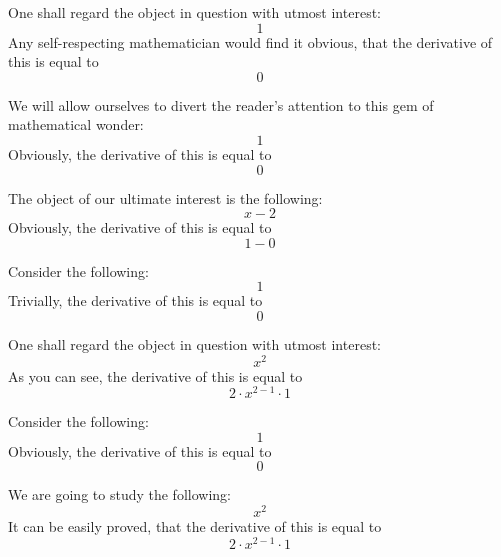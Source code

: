 \documentclass{article}
\begin{document}
One shall regard the object in question with utmost interest:
\begin{equation}
1 
\end{equation}
Any self-respecting mathematician would find it obvious, that the derivative of this is equal to
\begin{equation}
0 
\end{equation}

We will allow ourselves to divert the reader's attention to this gem of mathematical wonder:
\begin{equation}
1 
\end{equation}
Obviously, the derivative of this is equal to
\begin{equation}
0 
\end{equation}

The object of our ultimate interest is the following:
\begin{equation}
x - 2 
\end{equation}
Obviously, the derivative of this is equal to
\begin{equation}
1 - 0 
\end{equation}

Consider the following:
\begin{equation}
1 
\end{equation}
Trivially, the derivative of this is equal to
\begin{equation}
0 
\end{equation}

One shall regard the object in question with utmost interest:
\begin{equation}
x ^{2 } 
\end{equation}
As you can see, the derivative of this is equal to
\begin{equation}
2 \cdot x ^{2 - 1 } \cdot 1 
\end{equation}

Consider the following:
\begin{equation}
1 
\end{equation}
Obviously, the derivative of this is equal to
\begin{equation}
0 
\end{equation}

We are going to study the following:
\begin{equation}
x ^{2 } 
\end{equation}
It can be easily proved, that the derivative of this is equal to
\begin{equation}
2 \cdot x ^{2 - 1 } \cdot 1 
\end{equation}
\end{document}
